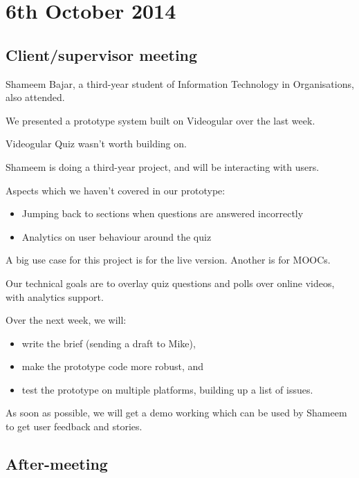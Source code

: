 \section{6th October 2014}\label{Minutes:2014-10-06}

\subsection{Client/supervisor meeting}

Shameem Bajar, a third-year student of Information Technology in
Organisations, also attended.

We presented a prototype system built on Videogular over the last week.

Videogular Quiz wasn't worth building on.

Shameem is doing a third-year project, and will be interacting with
users.

Aspects which we haven't covered in our prototype:

\begin{itemize}
\itemsep1pt\parskip0pt
\item
  Jumping back to sections when questions are answered incorrectly
\item
  Analytics on user behaviour around the quiz
\end{itemize}

A big use case for this project is for the live version. Another is for
MOOCs.

Our technical goals are to overlay quiz questions and polls over online
videos, with analytics support.

Over the next week, we will:

\begin{itemize}
\itemsep1pt\parskip0pt
\item
  write the brief (sending a draft to Mike),
\item
  make the prototype code more robust, and
\item
  test the prototype on multiple platforms, building up a list of
  issues.
\end{itemize}

As soon as possible, we will get a demo working which can be used by
Shameem to get user feedback and stories.

\subsection{After-meeting}

